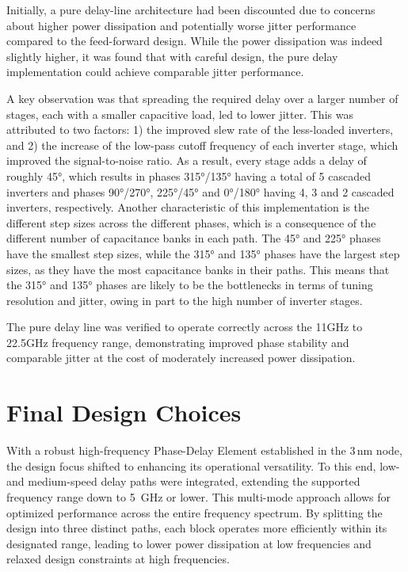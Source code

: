 Initially, a pure delay-line architecture had been discounted due to concerns about higher power dissipation and potentially worse jitter performance compared to the feed-forward design. While the power dissipation was indeed slightly higher, it was found that with careful design, the pure delay implementation could achieve comparable jitter performance.

A key observation was that spreading the required delay over a larger number of stages, each with a smaller capacitive load, led to lower jitter. This was attributed to two factors: 1) the improved slew rate of the less-loaded inverters, and 2) the increase of the low-pass cutoff frequency of each inverter stage, which improved the signal-to-noise ratio. As a result, every stage adds a delay of roughly \ang{45}, which results in phases \ang{315}/\ang{135} having a total of 5 cascaded inverters and phases \ang{90}/\ang{270}, \ang{225}/\ang{45} and \ang{0}/\ang{180} having 4, 3 and 2 cascaded inverters, respectively.
Another characteristic of this implementation is the different step sizes across the different phases, which is a consequence of the different number of capacitance banks in each path. The \ang{45} and \ang{225} phases have the smallest step sizes, while the \ang{315} and \ang{135} phases have the largest step sizes, as they have the most capacitance banks in their paths. This means that the \ang{315} and \ang{135} phases are likely to be the bottlenecks in terms of tuning resolution and jitter, owing in part to the high number of inverter stages.

The pure delay line was verified to operate correctly across the 11GHz to 22.5GHz frequency range, demonstrating improved phase stability and comparable jitter at the cost of moderately increased power dissipation.

\section{Final Design Choices}\label{sec:mixF_design}
With a robust high-frequency Phase-Delay Element established in the 3\,nm node, the design focus shifted to enhancing its operational versatility. To this end, low- and medium-speed delay paths were integrated, extending the supported frequency range down to 5~GHz or lower. This multi-mode approach allows for optimized performance across the entire frequency spectrum. By splitting the design into three distinct paths, each block operates more efficiently within its designated range, leading to lower power dissipation at low frequencies and relaxed design constraints at high frequencies.

